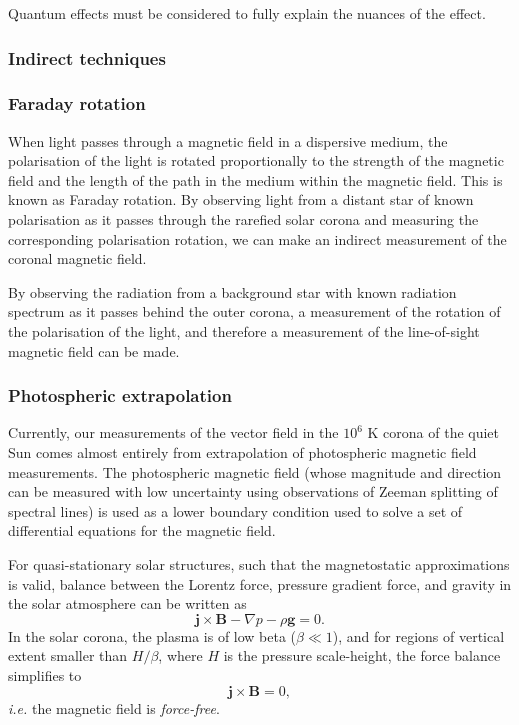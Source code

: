 \documentclass[12pt]{../style-files/ociamthesis}
\begin{document}
Quantum effects must be considered to fully explain the nuances of the effect.

\subsubsection{Indirect techniques}
\subsubsection{Faraday rotation}
When light passes through a magnetic field in a dispersive medium, the polarisation of the light is rotated proportionally to the strength of the magnetic field and the length of the path in the medium within the magnetic field. This is known as Faraday rotation. By observing light from a distant star of known polarisation as it passes through the rarefied solar corona and measuring the corresponding polarisation rotation, we can make an indirect measurement of the coronal magnetic field.

By observing the radiation from a background star with known radiation spectrum as it passes behind the outer corona, a measurement of the rotation of the polarisation of the light, and therefore a measurement of the line-of-sight magnetic field can be made.


\subsubsection{Photospheric extrapolation}
Currently, our measurements of the vector field in the $10^6$ K corona of the quiet Sun comes almost entirely from extrapolation of photospheric magnetic field measurements. The photospheric magnetic field (whose magnitude and direction can be measured with low uncertainty using observations of Zeeman splitting of spectral lines) is used as a lower boundary condition used to solve a set of differential equations for the magnetic field.

For quasi-stationary solar structures, such that the magnetostatic approximations is valid, balance between the Lorentz force, pressure gradient force, and gravity in the solar atmosphere can be written as
\begin{equation}
\mathbf{j} \times \mathbf{B} - \nabla p - \rho \mathbf{g} = 0.
\end{equation}
In the solar corona, the plasma is of low beta ($\beta \ll 1$), and for regions of vertical extent smaller than $H/\beta$, where $H$ is the pressure scale-height, the force balance simplifies to 
\begin{equation}
\mathbf{j} \times \mathbf{B} = 0,
\end{equation}
\textit{i.e.} the magnetic field is \textit{force-free}.
\end{document}
